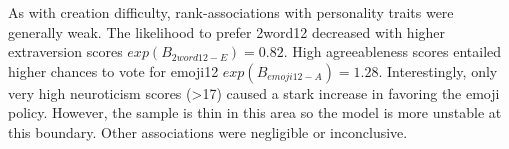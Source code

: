 As with creation difficulty, rank-associations with personality traits were generally weak. The likelihood to prefer 2word12 decreased with higher extraversion scores $exp(B_{2word12-E}) = 0.82$. High agreeableness scores entailed higher chances to vote for emoji12 $exp(B_{emoji12-A}) = 1.28$. Interestingly, only very high neuroticism scores (>17) caused a  stark increase in favoring the emoji policy. However, the sample is thin in this area so the model is more unstable at this boundary. Other associations were negligible or inconclusive. 




